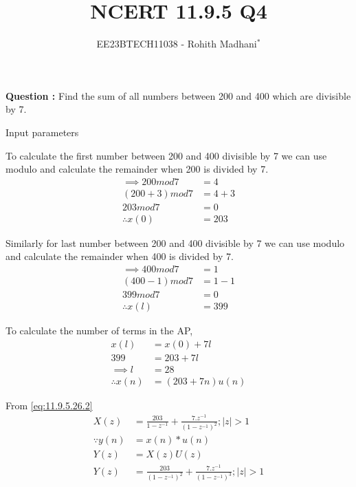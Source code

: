 \documentclass[journal,12pt,twocolumn]{IEEEtran}
\theoremstyle{remark}
\begin{document}

\vspace{3cm}

\title{NCERT 11.9.5 Q4}
\author{EE23BTECH11038 - Rohith Madhani$^{*}$%
}
\maketitle
\newpage
\bigskip
\renewcommand{\thefigure}{\theenumi}
\renewcommand{\thetable}{\theenumi}

\textbf{Question :} Find the sum of all numbers between 200 and 400 which are divisible by 7.\\
\solution 

\begin{table}[!h] 
\centering

\caption{Input parameters}
\label{table:11.9.5.4}
\end{table}

To calculate the first number between 200 and 400 divisible by 7 we can use modulo and calculate the remainder when 200 is divided by 7.
\begin{align}
    \implies 200mod7 &= 4 \\
    (200 + 3)mod7 &= 4 + 3 \\
    203mod7 &= 0 \\
    \therefore x(0) &= 203
\end{align}

Similarly for last number between 200 and 400 divisible by 7 we can use modulo and calculate the remainder when 400 is divided by 7. 
\begin{align}
    \implies 400mod7 &= 1 \\
    (400 - 1)mod7 &= 1-1 \\
    399mod7 &= 0 \\
    \therefore x(l) &= 399 
\end{align}

To calculate the number of terms in the AP,
\begin{align}
    x(l) &= x(0) + 7l \\
    399 &= 203 + 7l \\
    \implies l &= 28 \\
    \therefore x(n) &= (203 + 7n)u(n) 
\end{align}

From \eqref{eq:11.9.5.26.2}
\begin{align}
    X(z) &= \frac{203}{1-z^{-1}} + \frac{7.z^{-1}}{(1-z^{-1})^2} ; |z|>1 \\
    \because y(n) &= x(n)*u(n) \\
    Y(z) &= X(z)U(z) \\
    Y(z) &= \frac{203}{(1-z^{-1})^2} + \frac{7.z^{-1}}{(1-z^{-1})^3} ; |z|>1 
\end{align}
\end{document}
